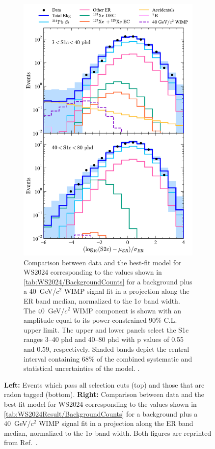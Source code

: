 \begin{figure}[!ht]
	\hfill
	\begin{subfigure}[b]{0.49\textwidth}
		\centering
		\includegraphics[width=\textwidth]{figures/WS2024Result/figure4.pdf}
		\caption{Comparison between data and the best-fit model for WS2024 corresponding to the values shown in \autoref{tab:WS2024/BackgroundCounts} for a background plus a 40~GeV/$c^2$ WIMP signal fit in a projection along the ER band median, normalized to the 1$\sigma$ band width. The 40~GeV/$c^2$ WIMP component is shown with an amplitude equal to its power-constrained 90\% C.L. upper limit. The upper and lower panels select the S1c ranges 3–40 phd and 40–80 phd with p values of 0.55 and 0.59, respectively. Shaded bands depict the central interval containing 68\% of the combined systematic and statistical uncertainties of the model. \cite{LZCollaboration:2024lux}.}
        \label{fig:WS2024Result/fig4}
	\end{subfigure}
	\caption{\textbf{Left:} Events which pass all selection cuts (top) and those that are radon tagged (bottom). \textbf{Right:} Comparison between data and the best-fit model for WS2024 corresponding to the values shown in \autoref{tab:WS2024Result/BackgroundCounts} for a background plus a 40~GeV/$c^2$ WIMP signal fit in a projection along the ER band median, normalized to the 1$\sigma$ band width. Both figures are reprinted from Ref.~\cite{LZCollaboration:2024lux}. \color{red}{Rewrite captions!}}
	\label{fig:WS2024Result/fig3_fig4}
\end{figure}

